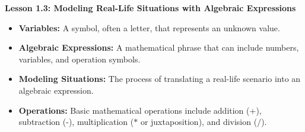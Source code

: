 \begin{center}
\textbf{Lesson 1.3: Modeling Real-Life Situations with Algebraic Expressions}
\end{center}


\begin{itemize}
    \item \textbf{Variables:} A symbol, often a letter, that represents an unknown value. 
    \item \textbf{Algebraic Expressions:} A mathematical phrase that can include numbers, variables, and operation symbols. 
    \item \textbf{Modeling Situations:} The process of translating a real-life scenario into an algebraic expression.
    \item \textbf{Operations:} Basic mathematical operations include addition (+), subtraction (-), multiplication (\(*\) or juxtaposition), and division (\(/\)).
\end{itemize}



 

 

